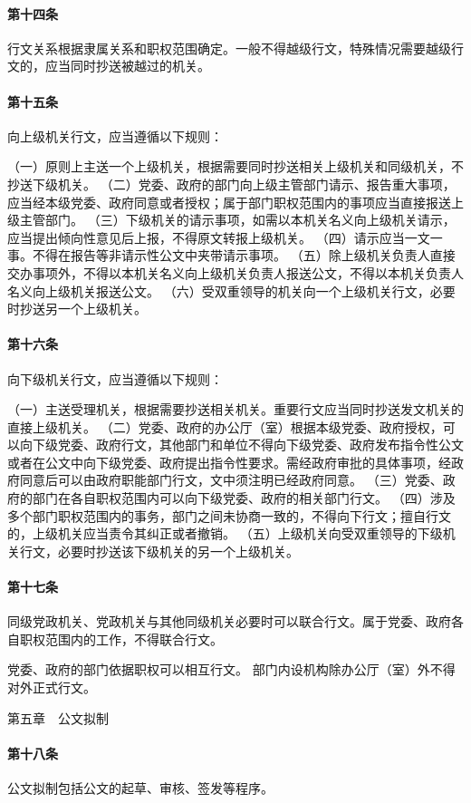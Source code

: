 \documentclass{gbt9704}
\begin{document}
\paragraph{第十四条}
行文关系根据隶属关系和职权范围确定。一般不得越级行文，特殊情况需要越级行文的，应当同时抄送被越过的机关。

\paragraph{第十五条}
向上级机关行文，应当遵循以下规则：

（一）原则上主送一个上级机关，根据需要同时抄送相关上级机关和同级机关，不抄送下级机关。
（二）党委、政府的部门向上级主管部门请示、报告重大事项，应当经本级党委、政府同意或者授权；属于部门职权范围内的事项应当直接报送上级主管部门。
（三）下级机关的请示事项，如需以本机关名义向上级机关请示，应当提出倾向性意见后上报，不得原文转报上级机关。
（四）请示应当一文一事。不得在报告等非请示性公文中夹带请示事项。
（五）除上级机关负责人直接交办事项外，不得以本机关名义向上级机关负责人报送公文，不得以本机关负责人名义向上级机关报送公文。
（六）受双重领导的机关向一个上级机关行文，必要时抄送另一个上级机关。
\paragraph{第十六条}
向下级机关行文，应当遵循以下规则：

（一）主送受理机关，根据需要抄送相关机关。重要行文应当同时抄送发文机关的直接上级机关。
（二）党委、政府的办公厅（室）根据本级党委、政府授权，可以向下级党委、政府行文，其他部门和单位不得向下级党委、政府发布指令性公文或者在公文中向下级党委、政府提出指令性要求。需经政府审批的具体事项，经政府同意后可以由政府职能部门行文，文中须注明已经政府同意。
（三）党委、政府的部门在各自职权范围内可以向下级党委、政府的相关部门行文。
（四）涉及多个部门职权范围内的事务，部门之间未协商一致的，不得向下行文；擅自行文的，上级机关应当责令其纠正或者撤销。
（五）上级机关向受双重领导的下级机关行文，必要时抄送该下级机关的另一个上级机关。
\paragraph{第十七条}
同级党政机关、党政机关与其他同级机关必要时可以联合行文。属于党委、政府各自职权范围内的工作，不得联合行文。

党委、政府的部门依据职权可以相互行文。
部门内设机构除办公厅（室）外不得对外正式行文。

第五章　公文拟制


\paragraph{第十八条}
公文拟制包括公文的起草、审核、签发等程序。
\end{document}
